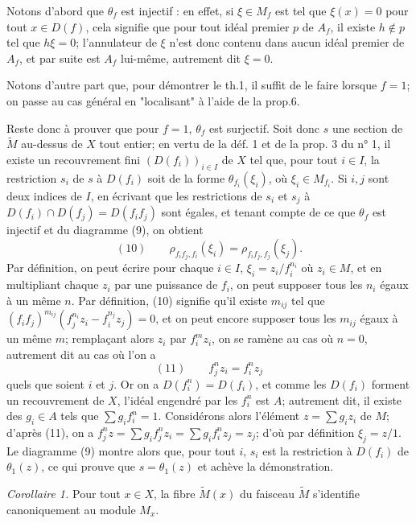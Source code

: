 Notons d'abord que $\theta_f$ est injectif : en effet, si $\xi \in M_f$ est tel que $\xi(x) = 0$ pour tout $x \in D(f)$, cela signifie que pour tout idéal premier $p$ de $A_f$, il existe $h \notin p$ tel que $h\xi = 0$; l'annulateur de $\xi$ n'est donc contenu dans aucun idéal premier de $A_f$, et par suite est $A_f$ lui-même, autrement dit $\xi = 0$.

Notons d'autre part que, pour démontrer le th.1, il suffit de le faire lorsque $f = 1$; on passe au cas général en "localisant" à l'aide de la prop.6.

\newpage


Reste donc à prouver que pour $f = 1$, $\theta_f$ est surjectif. Soit donc $s$ une section de $\tilde{M}$ au-dessus de $X$ tout entier; en vertu de la déf. 1 et de la prop. 3 du n° 1, il existe un recouvrement fini $(D(f_i))_{i \in I}$ de $X$ tel que, pour tout $i \in I$, la restriction $s_i$ de $s$ à $D(f_i)$ soit de la forme $\theta_{f_i}(\xi_i)$, où $\xi_i \in M_{f_i}$. Si $i, j$ sont deux indices de $I$, en écrivant que les restrictions de $s_i$ et $s_j$ à $D(f_i) \cap D(f_j) = D(f_i f_j)$ sont égales, et tenant compte de ce que $\theta_f$ est injectif et du diagramme (9), on obtient
$$(10) \qquad \rho_{f_i f_j, f_i}(\xi_i) = \rho_{f_i f_j, f_j}(\xi_j).$$
Par définition, on peut écrire pour chaque $i \in I$, $\xi_i = z_i / f_i^{n_i}$ où $z_i \in M$, et en multipliant chaque $z_i$ par une puissance de $f_i$, on peut supposer tous les $n_i$ égaux à un même $n$. Par définition, (10) signifie qu'il existe $m_{ij}$ tel que $(f_i f_j)^{m_{ij}} (f_j^{n_i} z_i - f_i^{n_j} z_j) = 0$, et on peut encore supposer tous les $m_{ij}$ égaux à un même $m$; remplaçant alors $z_i$ par $f_i^m z_i$, on se ramène au cas où $n = 0$, autrement dit au cas où l'on a
$$(11) \qquad f_j^n z_i = f_i^n z_j$$
quels que soient $i$ et $j$. Or on a $D(f_i^n) = D(f_i)$, et comme les $D(f_i)$ forment un recouvrement de $X$, l'idéal engendré par les $f_i^n$ est $A$; autrement dit, il existe des $g_i \in A$ tels que $\sum g_i f_i^n = 1$. Considérons alors l'élément $z = \sum g_i z_i$ de $M$; d'après (11), on a $f_j^n z = \sum g_i f_j^n z_i = \sum g_i f_i^n z_j = z_j$; d'où par définition $\xi_j = z/1$. Le diagramme (9) montre alors que, pour tout $i$, $s_i$ est la restriction à $D(f_i)$ de $\theta_1(z)$, ce qui prouve que $s = \theta_1(z)$ et achève la démonstration.

\emph{Corollaire 1.} Pour tout $x \in X$, la fibre $\tilde{M}(x)$ du faisceau $\tilde{M}$ s'identifie canoniquement au module $M_x$.

